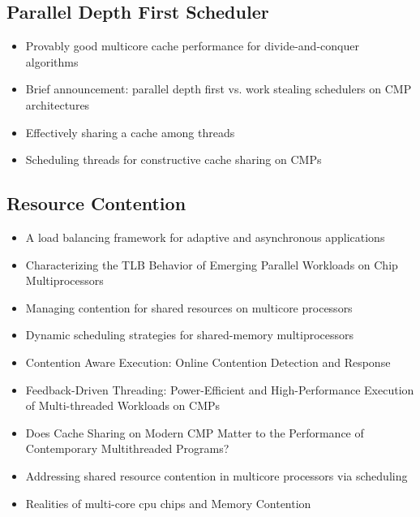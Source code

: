 \subsection{Parallel Depth First Scheduler}

\begin{itemize}
\item[\textbullet] Provably good multicore cache performance for
  divide-and-conquer algorithms \cite{Blelloch2008}
\item[\textbullet] Brief announcement: parallel depth first vs. work
  stealing schedulers on CMP architectures \cite{Liaskovitis2006}
\item[\textbullet] Effectively sharing a cache among threads
  \cite{Blelloch2004}
\item[\textbullet] Scheduling threads for constructive cache sharing
  on CMPs \cite{Chen2007}
\end{itemize}

\subsection{Resource Contention}

\begin{itemize}
\item[\textbullet] A load balancing framework for adaptive and
  asynchronous applications \cite{Barker2004}
\item[\textbullet] Characterizing the TLB Behavior of Emerging
  Parallel Workloads on Chip Multiprocessors \cite{Bhattacharjee2009}
\item[\textbullet] Managing contention for shared resources on
  multicore processors \cite{Fedorova2010}
\item[\textbullet] Dynamic scheduling strategies for shared-memory
  multiprocessors \cite{Hamidzadeh1996}
\item[\textbullet] Contention Aware Execution: Online Contention
  Detection and Response \cite{Soffa2010}
\item[\textbullet] Feedback-Driven Threading: Power-Efficient and
  High-Performance Execution of Multi-threaded Workloads on CMPs
  \cite{Suleman2008}
\item[\textbullet] Does Cache Sharing on Modern CMP Matter to the
  Performance of Contemporary Multithreaded Programs? \cite{Zhang2010}
\item[\textbullet] Addressing shared resource contention in multicore
  processors via scheduling \cite{Zhuravlev2010}
\item[\textbullet] Realities of multi-core cpu chips and Memory
  Contention \cite{Barker2009}
\end{itemize}




